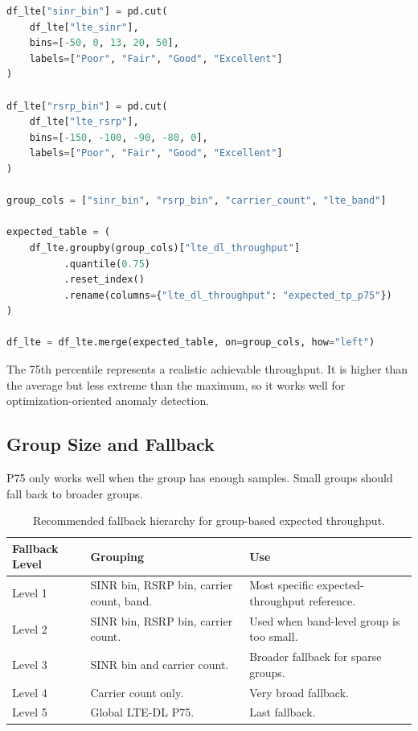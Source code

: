 \documentclass[12pt,a4paper]{article}
\begin{document}
\begin{lstlisting}[language=Python]
df_lte["sinr_bin"] = pd.cut(
    df_lte["lte_sinr"],
    bins=[-50, 0, 13, 20, 50],
    labels=["Poor", "Fair", "Good", "Excellent"]
)

df_lte["rsrp_bin"] = pd.cut(
    df_lte["lte_rsrp"],
    bins=[-150, -100, -90, -80, 0],
    labels=["Poor", "Fair", "Good", "Excellent"]
)

group_cols = ["sinr_bin", "rsrp_bin", "carrier_count", "lte_band"]

expected_table = (
    df_lte.groupby(group_cols)["lte_dl_throughput"]
          .quantile(0.75)
          .reset_index()
          .rename(columns={"lte_dl_throughput": "expected_tp_p75"})
)

df_lte = df_lte.merge(expected_table, on=group_cols, how="left")
\end{lstlisting}

The 75th percentile represents a realistic achievable throughput. It is higher than the average but less extreme than the maximum, so it works well for optimization-oriented anomaly detection.

\subsection{Group Size and Fallback}

P75 only works well when the group has enough samples. Small groups should fall back to broader groups.

\begin{table}[H]
\centering
\begin{tabularx}{\textwidth}{@{}L{0.22\textwidth}YY@{}}
\toprule
\textbf{Fallback Level} & \textbf{Grouping} & \textbf{Use} \\
\midrule
Level 1 & SINR bin, RSRP bin, carrier count, band. & Most specific expected-throughput reference. \\
Level 2 & SINR bin, RSRP bin, carrier count. & Used when band-level group is too small. \\
Level 3 & SINR bin and carrier count. & Broader fallback for sparse groups. \\
Level 4 & Carrier count only. & Very broad fallback. \\
Level 5 & Global LTE-DL P75. & Last fallback. \\
\bottomrule
\end{tabularx}
\caption{Recommended fallback hierarchy for group-based expected throughput.}
\end{table}
\end{document}
